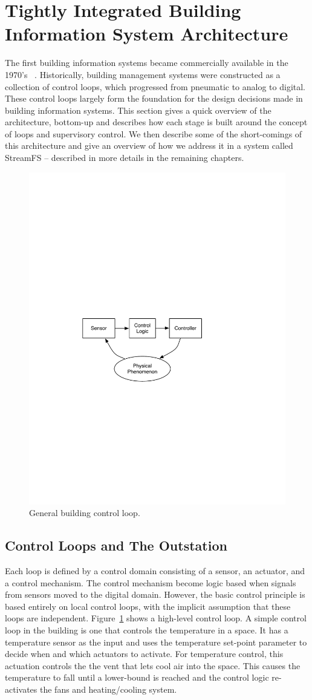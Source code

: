 \section{Tightly Integrated Building Information System Architecture}

The first building information systems became commercially available in the 1970's ~\cite{gardner1987energy}.  
Historically, building management 
systems were constructed as a collection of control loops, which progressed from pneumatic to analog to digital.
These control loops largely form the foundation for the design decisions made in building information systems.  
This section gives a quick overview of the architecture, bottom-up and describes how each stage is built around
the concept of loops and supervisory control.  We then describe some of the short-comings of this architecture
and give an overview of how we address it in a system called StreamFS -- described in more details in
the remaining chapters.

\begin{figure}[t!] %
\centering
\includegraphics[width=0.50\columnwidth]{figs/control_loop}
\caption{General building control loop.}
\label{fig:control_loop}
\end{figure}

\subsection{Control Loops and The Outstation}
\label{sec:control_loops}
Each loop is defined by a control domain consisting of a sensor, an actuator, and a control mechanism.  The control mechanism
become logic based when signals from sensors moved to the digital domain.  However, the basic control principle is based
entirely on local control loops, with the implicit assumption that these loops are independent.
Figure~\ref{fig:control_loop} shows a high-level control loop.  A simple control loop in the building is one that controls
the temperature in a space.  It has a temperature sensor as the input and uses the temperature set-point parameter to 
decide when and which actuators to activate.
For temperature control, this actuation controls the the vent that lets cool air into the space.  This causes the temperature
to fall until a lower-bound is reached and the control logic re-activates the fans and heating/cooling system.

